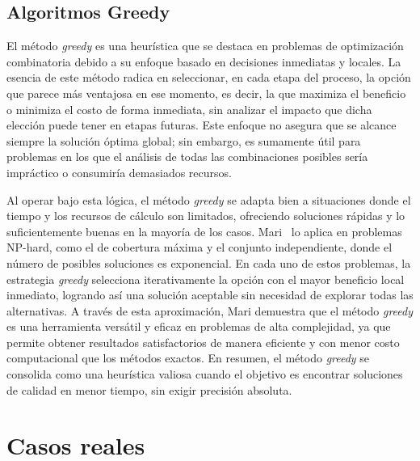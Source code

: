 \documentclass[9pt,a4paper,twoside]{rho-class/rho}
\begin{document}
        \subsection{Algoritmos Greedy}
            El método \textit{greedy} es una heurística que se destaca en problemas de optimización combinatoria debido a su enfoque basado en decisiones inmediatas y locales. La esencia de este método radica en seleccionar, en cada etapa del proceso, la opción que parece más ventajosa en ese momento, es decir, la que maximiza el beneficio o minimiza el costo de forma inmediata, sin analizar el impacto que dicha elección puede tener en etapas futuras. Este enfoque no asegura que se alcance siempre la solución óptima global; sin embargo, es sumamente útil para problemas en los que el análisis de todas las combinaciones posibles sería impráctico o consumiría demasiados recursos.
            \par\medskip
            Al operar bajo esta lógica, el método \textit{greedy} se adapta bien a situaciones donde el tiempo y los recursos de cálculo son limitados, ofreciendo soluciones rápidas y lo suficientemente buenas en la mayoría de los casos. Mari~\cite{Mari2020} lo aplica en problemas NP-hard, como el de cobertura máxima y el conjunto independiente, donde el número de posibles soluciones es exponencial. En cada uno de estos problemas, la estrategia \textit{greedy} selecciona iterativamente la opción con el mayor beneficio local inmediato, logrando así una solución aceptable sin necesidad de explorar todas las alternativas. A través de esta aproximación, Mari demuestra que el método \textit{greedy} es una herramienta versátil y eficaz en problemas de alta complejidad, ya que permite obtener resultados satisfactorios de manera eficiente y con menor costo computacional que los métodos exactos. En resumen, el método \textit{greedy} se consolida como una heurística valiosa cuando el objetivo es encontrar soluciones de calidad en menor tiempo, sin exigir precisión absoluta.

            
    
    \section{Casos reales}
\end{document}
